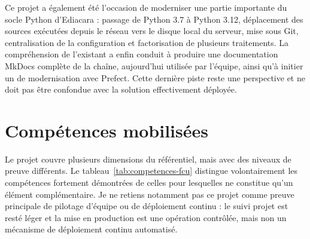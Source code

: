 Ce projet a également été l'occasion de moderniser une partie importante du socle Python d'Ediacara : passage de Python 3.7 à Python 3.12, déplacement des sources exécutées depuis le réseau vers le disque local du serveur, mise sous Git, centralisation de la configuration et factorisation de plusieurs traitements. La compréhension de l'existant a enfin conduit à produire une documentation MkDocs complète de la chaîne, aujourd'hui utilisée par l'équipe, ainsi qu'à initier un  de modernisation avec Prefect. Cette dernière piste reste une perspective et ne doit pas être confondue avec la solution  effectivement déployée.

\section{Compétences mobilisées}

Le projet couvre plusieurs dimensions du référentiel, mais avec des niveaux de preuve différents. Le tableau~\ref{tab:competences-fcu} distingue volontairement les compétences fortement démontrées de celles pour lesquelles  ne constitue qu'un élément complémentaire. Je ne retiens notamment pas ce projet comme preuve principale de pilotage d'équipe ou de déploiement continu : le suivi projet est resté léger et la mise en production est une opération contrôlée, mais non un mécanisme de déploiement continu automatisé.

